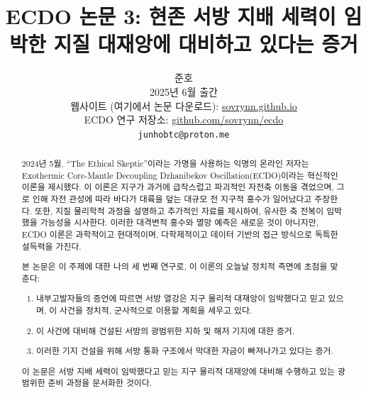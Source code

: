 \documentclass[10pt,twocolumn,letterpaper]{article}
\begin{document}
\title{ECDO 논문 3: 현존 서방 지배 세력이 임박한 지질 대재앙에 대비하고 있다는 증거}

\author{준호\\
2025년 6월 출간\\
웹사이트 (여기에서 논문 다운로드): \href{https://sovrynn.github.io}{sovrynn.github.io}\\
ECDO 연구 저장소: \href{https://github.com/sovrynn/ecdo}{github.com/sovrynn/ecdo}\\
{\tt\small junhobtc@proton.me}
}

\maketitle

\begin{abstract}
2024년 5월, “The Ethical Skeptic”이라는 가명을 사용하는 익명의 온라인 저자는 Exothermic Core-Mantle Decoupling Dzhanibekov Oscillation(ECDO)이라는 혁신적인 이론을 제시했다\cite{0,1}. 이 이론은 지구가 과거에 급작스럽고 파괴적인 자전축 이동을 겪었으며, 그로 인해 자전 관성에 따라 바다가 대륙을 덮는 대규모 전 지구적 홍수가 일어났다고 주장한다. 또한, 지질 물리학적 과정을 설명하고 추가적인 자료를 제시하여, 유사한 축 전복이 임박했을 가능성을 시사한다. 이러한 대격변적 홍수와 멸망 예측은 새로운 것이 아니지만, ECDO 이론은 과학적이고 현대적이며, 다학제적이고 데이터 기반의 접근 방식으로 독특한 설득력을 가진다.

본 논문은 이 주제에 대한 나의 세 번째 연구\cite{2,3}로, 이 이론의 오늘날 정치적 측면에 초점을 맞춘다:

\begin{flushleft}
\begin{enumerate}
    \item 내부고발자들의 증언에 따르면 서방 열강은 지구 물리적 대재앙이 임박했다고 믿고 있으며, 이 사건을 정치적, 군사적으로 이용할 계획을 세우고 있다.
    \item 이 사건에 대비해 건설된 서방의 광범위한 지하 및 해저 기지에 대한 증거.
    \item 이러한 기지 건설을 위해 서방 통화 구조에서 막대한 자금이 빠져나가고 있다는 증거.
\end{enumerate}
\end{flushleft}

이 논문은 서방 지배 세력이 임박했다고 믿는 지구 물리적 대재앙에 대비해 수행하고 있는 광범위한 준비 과정을 문서화한 것이다.
\end{abstract}
\end{document}

